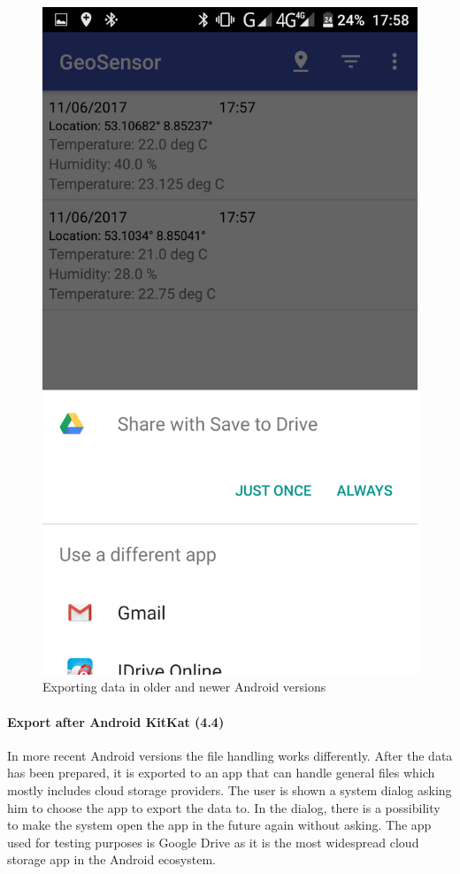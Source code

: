 \begin{figure}
\begin{minipage}{.5\textwidth}
  \includegraphics[width=.8\linewidth]{src/export_new.png}
\end{minipage}
\caption{Exporting data in older and newer Android versions}
\label{fig:export_old}
\end{figure}

\paragraph{Export after Android KitKat (4.4)}
In more recent Android versions the file handling works differently. After the data has been prepared, it is exported to an app that can handle general files which mostly includes cloud storage providers. The user is shown a system dialog asking him to choose the app to export the data to. In the dialog, there is a possibility to make the system open the app in the future again without asking. The app used for testing purposes is Google Drive as it is the most widespread cloud storage app in the Android ecosystem.

